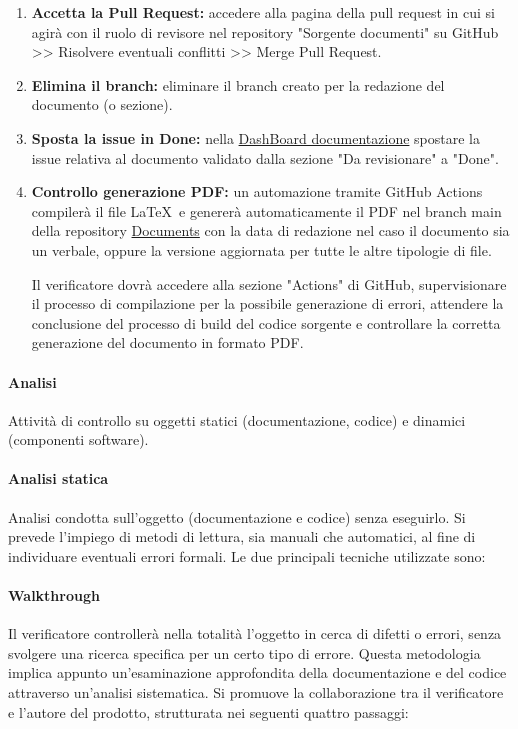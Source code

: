 \begin{enumerate}
    \item \textbf{Accetta la Pull Request:} 
        accedere alla pagina della pull request in cui si agirà con il ruolo di revisore nel repository "Sorgente documenti" su GitHub >> Risolvere eventuali conflitti >> Merge Pull Request.
    \item \textbf{Elimina il branch:} 
        eliminare il branch creato per la redazione del documento (o sezione).
    \item \textbf{Sposta la issue in Done:} 
        nella \href{https://github.com/orgs/ByteOps-swe/projects/1/views/1}{DashBoard documentazione} spostare la issue relativa al documento validato dalla sezione "Da revisionare" a "Done".
    \item \textbf{Controllo generazione PDF:} 
        un automazione tramite GitHub Actions compilerà il file \LaTeX\ e genererà automaticamente il PDF nel branch main della repository \href{https://github.com/ByteOps-swe/Documents}{Documents} con la data di redazione nel caso il documento sia un verbale, oppure la versione aggiornata per tutte le altre tipologie di file. 

        Il verificatore dovrà accedere alla sezione "Actions" di GitHub, supervisionare il processo di compilazione per la possibile generazione di errori, attendere la conclusione del processo di build del codice sorgente e controllare la corretta generazione del documento in formato PDF. 
\end{enumerate}

\paragraph{Analisi}
Attività di controllo su oggetti statici (documentazione, codice) e dinamici (componenti software). 

\paragraph*{Analisi statica}
Analisi condotta sull'oggetto (documentazione e codice) senza eseguirlo. Si prevede l'impiego di metodi di lettura, sia manuali che automatici, al fine di individuare eventuali errori formali. Le due principali tecniche utilizzate sono: 

\paragraph*{Walkthrough}
    Il verificatore controllerà nella totalità l’oggetto in cerca di difetti o errori, senza svolgere una ricerca specifica per un certo tipo di errore.
    Questa metodologia implica appunto un'esaminazione approfondita della documentazione e del codice attraverso un'analisi sistematica. Si promuove la collaborazione tra il verificatore e l'autore del prodotto, strutturata nei seguenti quattro passaggi: 

